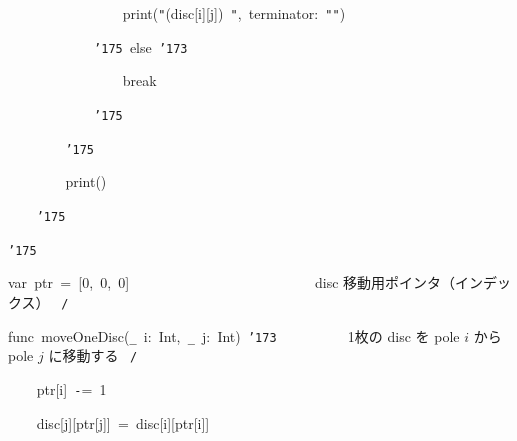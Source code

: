 \documentclass[a4paper,10pt]{article}
\def\mc{\relax}
\begin{document}
\noindent
\mbox{}{\tt\mc \ }{\tt\mc \ }{\tt\mc \ }{\tt\mc \ }{\tt\mc \ }{\tt\mc \ }{\tt\mc \ }{\tt\mc \ }{\tt\mc \ }{\tt\mc \ }{\tt\mc \ }{\tt\mc \ }{\tt\mc \ }{\tt\mc \ }{\tt\mc \ }{\tt\mc \ }print({\tt "}{\tt{}}(disc[i][j]){\tt\mc \ }{\tt "},{\tt\mc \ }terminator:{\tt\mc \ }{\tt "}{\tt "})

\noindent
\mbox{}{\tt\mc \ }{\tt\mc \ }{\tt\mc \ }{\tt\mc \ }{\tt\mc \ }{\tt\mc \ }{\tt\mc \ }{\tt\mc \ }{\tt\mc \ }{\tt\mc \ }{\tt\mc \ }{\tt\mc \ }{\tt\char'175}{\tt\mc \ }else{\tt\mc \ }{\tt\char'173}

\noindent
\mbox{}{\tt\mc \ }{\tt\mc \ }{\tt\mc \ }{\tt\mc \ }{\tt\mc \ }{\tt\mc \ }{\tt\mc \ }{\tt\mc \ }{\tt\mc \ }{\tt\mc \ }{\tt\mc \ }{\tt\mc \ }{\tt\mc \ }{\tt\mc \ }{\tt\mc \ }{\tt\mc \ }break

\noindent
\mbox{}{\tt\mc \ }{\tt\mc \ }{\tt\mc \ }{\tt\mc \ }{\tt\mc \ }{\tt\mc \ }{\tt\mc \ }{\tt\mc \ }{\tt\mc \ }{\tt\mc \ }{\tt\mc \ }{\tt\mc \ }{\tt\char'175}

\noindent
\mbox{}{\tt\mc \ }{\tt\mc \ }{\tt\mc \ }{\tt\mc \ }{\tt\mc \ }{\tt\mc \ }{\tt\mc \ }{\tt\mc \ }{\tt\char'175}

\noindent
\mbox{}{\tt\mc \ }{\tt\mc \ }{\tt\mc \ }{\tt\mc \ }{\tt\mc \ }{\tt\mc \ }{\tt\mc \ }{\tt\mc \ }print()

\noindent
\mbox{}{\tt\mc \ }{\tt\mc \ }{\tt\mc \ }{\tt\mc \ }{\tt\char'175}

\noindent
\mbox{}{\tt\char'175}

\noindent
\mbox{}\hfill

\noindent
\mbox{}var{\tt\mc \ }ptr{\tt\mc \ }={\tt\mc \ }[0,{\tt\mc \ }0,{\tt\mc \ }0]{\tt\mc \ \ \ \ \ \ \ \ }{\tt\mc \ \ \ \ \ \ \ \ }{\tt\mc \ \ \ \ \ \ \ \ }\rm\mc {\tt /}{\tt *}\  \ disc 移動用ポインタ（インデックス）
					   \hfill \rm\mc \ {\tt *}{\tt /}
\tt\mc 

\noindent
\mbox{}\hfill

\noindent
\mbox{}func{\tt\mc \ }moveOneDisc({\tt\_}{\tt\mc \ }i:{\tt\mc \ }Int,{\tt\mc \ }{\tt\_}{\tt\mc \ }j:{\tt\mc \ }Int){\tt\mc \ }{\tt\char'173}{\tt\mc \ \ \ \ \ \ \ \ }\rm\mc {\tt /}{\tt *}\  \ 1枚の disc を pole $i$ から
					   pole $j$ に移動する \hfill \rm\mc \ {\tt *}{\tt /}
\tt\mc 

\noindent
\mbox{}{\tt\mc \ }{\tt\mc \ }{\tt\mc \ }{\tt\mc \ }ptr[i]{\tt\mc \ }{\tt -}={\tt\mc \ }1

\noindent
\mbox{}{\tt\mc \ }{\tt\mc \ }{\tt\mc \ }{\tt\mc \ }disc[j][ptr[j]]{\tt\mc \ }={\tt\mc \ }disc[i][ptr[i]]
\end{document}
